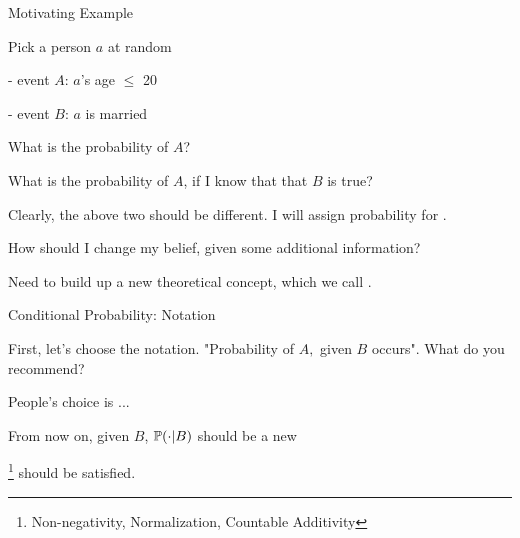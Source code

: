 
\begin{frame}{Motivating Example}

\plitemsep 0.1in
\bci 

\item<1-> Pick a person $a$ at random

- event $A$: $a$'s age $\leq$ 20

- event $B$: $a$ is married


\item<2->  What is the probability of $A$?

\item<2->  What is the probability of $A$, if I know that that $B$ is true?

\item<3-> Clearly, the above two should be different. I will assign  probability for .

\item<4->  How should I change my belief, given some additional information?

\item<5-> Need to build up a new theoretical concept, which we call .

\eci 

\end{frame}

\begin{frame}{Conditional Probability: Notation}

\bci

\item<1-> First, let's choose the notation. "Probability of $A,$ given $B$ occurs". What do you recommend?

\item<3-> People's choice is ... 

\item<5-> From now on, given $B$, $\mathbb{P}( \cdot | B )$ should be a new 
\bci
\item<6-> \footnote{Non-negativity, Normalization, Countable Additivity}  should be satisfied.
\eci

\eci 

\end{frame}

